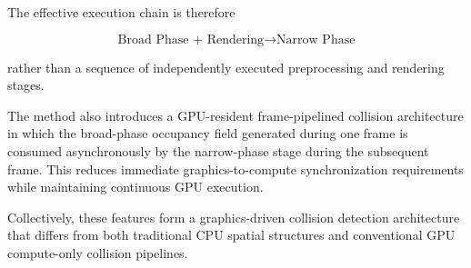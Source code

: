 \documentclass{article}
\begin{document}
The effective execution chain is therefore

\[
\text{Broad Phase + Rendering}
\rightarrow
\text{Narrow Phase}
\]

rather than a sequence of independently executed preprocessing and rendering stages.

The method also introduces a GPU-resident frame-pipelined collision architecture in which the broad-phase occupancy field generated during one frame is consumed asynchronously by the narrow-phase stage during the subsequent frame. This reduces immediate graphics-to-compute synchronization requirements while maintaining continuous GPU execution.

Collectively, these features form a graphics-driven collision detection architecture that differs from both traditional CPU spatial structures and conventional GPU compute-only collision pipelines.
\end{document}
